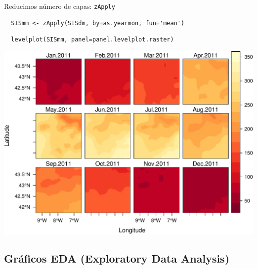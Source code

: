 \documentclass[xcolor={usenames,svgnames,dvipsnames}]{beamer}
\begin{document}
\begin{frame}[fragile,label=sec-4-2-2]{Reducimos número de capas: \texttt{zApply}}
 \lstset{language=R,label= ,caption= ,numbers=none}
\begin{lstlisting}
  SISmm <- zApply(SISdm, by=as.yearmon, fun='mean')
\end{lstlisting}

\lstset{language=R,label= ,caption= ,numbers=none}
\begin{lstlisting}
  levelplot(SISmm, panel=panel.levelplot.raster)
\end{lstlisting}

\includegraphics[width=.9\linewidth]{figs/SISmm.pdf}
\end{frame}

\subsection{Gráficos EDA (Exploratory Data Analysis)}
\label{sec-4-3}
\end{document}
